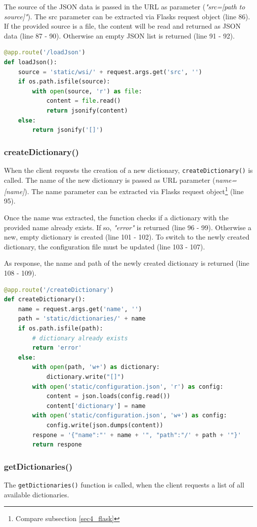 The source of the JSON data is passed in the URL as parameter (\emph{"src=[path to source]"}). The src parameter can be extracted via Flasks request object (line 86). If the provided source is a file, the content will be read and returned as JSON data (line 87 - 90). Otherwise an empty JSON list is returned (line 91 - 92).\clearpage

\begin{lstlisting}[language=Python, frame=single]
@app.route('/loadJson')
def loadJson():
	source = 'static/wsi/' + request.args.get('src', '')
	if os.path.isfile(source):
		with open(source, 'r') as file:
			content = file.read()
			return jsonify(content)
	else:
		return jsonify('[]')
\end{lstlisting}


\subsubsection{createDictionary()}
When the client requests the creation of a new dictionary, \texttt{createDictionary()} is called. The name of the new dictionary is passed as URL parameter (\emph{name= [name]}). The name parameter can be extracted via Flasks request object\footnote{Compare subsection \ref{sec4_flask}} (line 95).

Once the name was extracted, the function checks if a dictionary with the provided name already exists. If so, \emph{"error"} is returned (line 96 - 99). Otherwise a new, empty dictionary is created (line 101 - 102). To switch to the newly created dictionary, the configuration file must be updated (line 103 - 107).

As response, the name and path of the newly created dictionary is returned (line 108 - 109).

\begin{lstlisting}[language=Python, frame=single]
@app.route('/createDictionary')
def createDictionary():
	name = request.args.get('name', '')
	path = 'static/dictionaries/' + name
	if os.path.isfile(path):
		# dictionary already exists
		return 'error'
	else:
		with open(path, 'w+') as dictionary:
			dictionary.write("[]")
		with open('static/configuration.json', 'r') as config:
			content = json.loads(config.read())
			content['dictionary'] = name
		with open('static/configuration.json', 'w+') as config:
			config.write(json.dumps(content))
		respone = '{"name":"' + name + '", "path":"/' + path + '"}'
		return respone
\end{lstlisting}


\subsubsection{getDictionaries()}
The \texttt{getDictionaries()} function is called, when the client requests a list of all available dictionaries.

